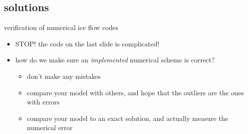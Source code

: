 \subsection{solutions}

\begin{frame}{verification of numerical ice flow codes}
\begin{itemize}
\item STOP! \quad the code on the last slide is complicated!

\bigskip
\item<2-> how do we make sure an \emph{implemented} numerical scheme is correct?
  \begin{itemize}
  \item<3->[\emph{technique} 1] don't make any mistakes
  \item<4->[\emph{technique} 2] compare your model with others, and hope that the outliers are the ones with errors 
  \item<5>[\emph{technique} 3] compare your model to an exact solution, and actually measure the numerical error 
  \end{itemize}
\end{itemize}
\end{frame}


